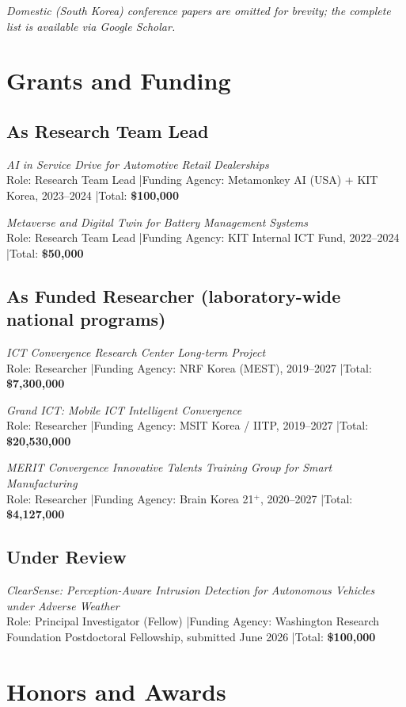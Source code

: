 \documentclass[11pt, letterpaper]{article}
\newcommand{\grantentry}[5]{%
  \noindent[{\color{uwred}\textbf{#1}}] \textit{#2}\\
  \hspace*{1em}Role: #3 \quad|\quad Funding Agency: #4 \quad|\quad Total: \textbf{#5}\vspace{4pt}\par
}
\begin{document}


\textcolor{uwred}{\textit{Domestic (South Korea) conference papers are omitted for brevity; the complete list is available via Google Scholar.}}



\section{Grants and Funding}


\subsection*{As Research Team Lead}
\grantentry{G2}{AI in Service Drive for Automotive Retail Dealerships}{Research Team Lead}{Metamonkey AI (USA) + KIT Korea, 2023--2024}{\$100,000}
\grantentry{G1}{Metaverse and Digital Twin for Battery Management Systems}{Research Team Lead}{KIT Internal ICT Fund, 2022--2024}{\$50,000}

\subsection*{As Funded Researcher (laboratory-wide national programs)}

\grantentry{G5}{ICT Convergence Research Center Long-term Project}{Researcher}{NRF Korea (MEST), 2019--2027}{\$7,300,000}

\grantentry{G4}{Grand ICT: Mobile ICT Intelligent Convergence}{Researcher}{MSIT Korea / IITP, 2019--2027}{\$20,530,000}

\grantentry{G3}{MERIT Convergence Innovative Talents Training Group for Smart Manufacturing}{Researcher}{Brain Korea 21$^+$, 2020--2027}{\$4,127,000}

\subsection*{Under Review}
\grantentry{P1}{ClearSense: Perception-Aware Intrusion Detection for Autonomous Vehicles under Adverse Weather}{Principal Investigator (Fellow)}{Washington Research Foundation Postdoctoral Fellowship, submitted June 2026}{\$100,000}


\section{Honors and Awards}
\end{document}
